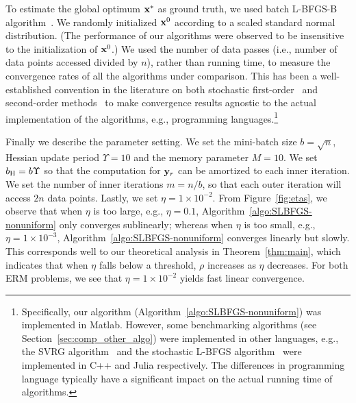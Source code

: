 \documentclass[10pt,twocolumn,journal]{IEEEtran}
\begin{document}
To estimate the global optimum $\mathbf{x}^*$ as ground truth, we used batch L-BFGS-B algorithm~\cite{Zhu_97}.
We randomly initialized $\mathbf{x}^0$ according to a scaled standard normal distribution. (The performance of our algorithms were observed to be insensitive to the initialization of $\mathbf{x}^0$.) We used the number of data passes (i.e., number of data points accessed divided by $n$), rather than running time, to measure the convergence rates of all the algorithms under comparison. This has been a well-established convention in the literature on both stochastic first-order~\cite{Johnson_13,Defazio_14,Reza_15} and second-order methods~\cite{Byrd_16a,Moritz_16,Gower_16} to make convergence results agnostic to the actual implementation of the algorithms, e.g., programming languages.\footnote{Specifically, our algorithm (Algorithm~\ref{algo:SLBFGS-nonuniform}) was implemented in Matlab\textsuperscript\textregistered. However, some benchmarking algorithms (see Section~\ref{sec:comp_other_algo}) were implemented in other languages, e.g., the SVRG algorithm~\cite{Johnson_13} and the stochastic L-BFGS algorithm~\cite{Moritz_16} were implemented in C++ and Julia respectively. The differences in programming language typically have a significant impact on the actual running time of algorithms.} %

Finally we describe the parameter setting. We set the mini-batch size $b=\sqrt{n}$, Hessian update period $\Upsilon=10$ and the memory parameter $M=10$. We set $b_{\mathrm{H}}=b\Upsilon$ so that the computation for $\mathbf{y}_r$ can be amortized to each inner iteration. We set the number of inner iterations $m=n/b$, so that each outer iteration will access $2n$ data points. Lastly, we set $\eta=1\times10^{-2}$. From Figure~\ref{fig:etas}, we observe that when $\eta$ is too large, e.g., $\eta=0.1$, Algorithm~\ref{algo:SLBFGS-nonuniform} only converges sublinearly; whereas when $\eta$ is too small, e.g., $\eta=1\times10^{-3}$, Algorithm~\ref{algo:SLBFGS-nonuniform} converges linearly but slowly. This corresponds well to our theoretical analysis in Theorem~\ref{thm:main}, which indicates that when $\eta$ falls below a threshold, $\rho$ increases as $\eta$ decreases. For both ERM problems, we see that $\eta=1\times10^{-2}$ yields fast linear convergence. 
\end{document}
